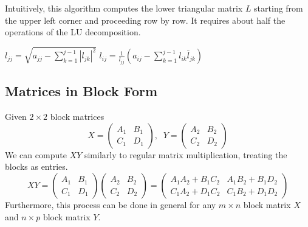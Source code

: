   \begin{algo}
    Intuitively, this algorithm computes the lower triangular matrix $L$ starting from the upper left corner and proceeding row by row. It requires about half the operations of the LU decomposition.
    \begin{algorithmic}[1]
            \STATE $l_{jj} = \sqrt{ a_{jj} - \sum_{k=1}^{j-1} |l_{jk}|^2 }$
          \ELSE
            \STATE $l_{ij} = \frac{1}{l_{jj}} \left( a_{ij} - \sum_{k=1}^{j-1} l_{ik} \bar{l}_{jk} \right)$
          \ENDIF
        \ENDFOR
      \ENDFOR
    \end{algorithmic}
  \end{algo}

\subsection{Matrices in Block Form}

  \begin{theorem}
    Given $2 \times 2$ block matrices
    \begin{equation}
      X = \begin{pmatrix}
      A_1&B_1\\C_1&D_1
      \end{pmatrix}, \; \; Y = \begin{pmatrix}
      A_2&B_2\\C_2&D_2
      \end{pmatrix}
    \end{equation}
    We can compute $X Y$ similarly to regular matrix multiplication, treating the blocks as entries. 
    \begin{equation}
      X Y = \begin{pmatrix}
      A_1&B_1\\C_1&D_1
      \end{pmatrix} \begin{pmatrix}
      A_2&B_2\\C_2&D_2
      \end{pmatrix} = \begin{pmatrix}
      A_1 A_2 + B_1 C_2 & A_1 B_2 + B_1 D_2 \\
      C_1 A_2 + D_1 C_2 & C_1 B_2 + D_1 D_2 
      \end{pmatrix}
    \end{equation}
    Furthermore, this process can be done in general for any $m \times n$ block matrix $X$ and $n \times p$ block matrix $Y$. 
  \end{theorem}

